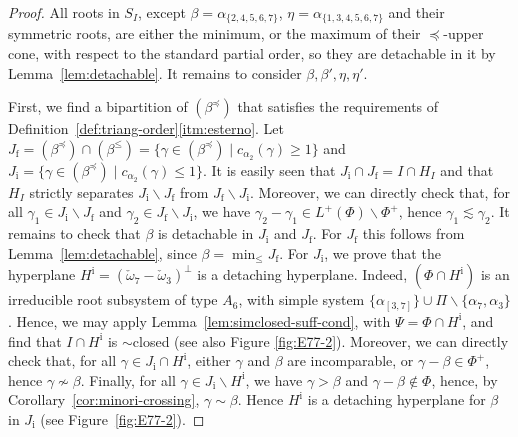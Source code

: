\documentclass[10pt]{amsart}
\theoremstyle{definition}
\theoremstyle{remark}
\newcommand\smeno{\smallsetminus}
\newcommand\al{\alpha}
\newcommand\be{\beta}
\newcommand\ga{\gamma}
\newcommand\preq{\preccurlyeq}
\renewcommand{\leq}{\leqslant}
\begin{document}
\begin{proof}
\par
All roots in $S_I$, except $\be=\al_{\{2, 4, 5, 6,7\}}$, $\eta=\al_{\{1, 3, 4, 5, 6,7\}}$ and their symmetric roots, are either the minimum, or the maximum of their $\preq$-upper cone, with respect to the standard partial order, so they are detachable in it by Lemma~\ref{lem:detachable}. 
It remains to consider $\be, \be', \eta, \eta'$.

\par
First, we find a bipartition of  $(\be^\preq)$ that satisfies the requirements of Definition~\ref{def:triang-order}\ref{itm:esterno}. 
Let $J_{\mathrm f}=(\be^\preq)\cap (\be^\leq) =\{\ga\in (\be^\preq)\mid c_{\al_2}(\ga)\geq 1\}$ and $J_{\mathrm i}=\{\ga\in (\be^\preq)\mid c_{\al_2}(\ga)\leq 1\}$. 
It is easily seen that $J_{\mathrm i}\cap J_{\mathrm f}=I\cap H_I$ and that $H_I$ strictly separates $J_{\mathrm i}\smeno J_{\mathrm f}$ from $J_{\mathrm f}\smeno J_{\mathrm i}$. 
Moreover, we can directly check that,  for all $\ga_1\in J_{\mathrm i}\smeno J_{\mathrm f}$ and $\ga_2\in J_{\mathrm f}\smeno J_{\mathrm i}$, we have $\ga_2-\ga_1 \in 
L^+(\Phi)\smeno \Phi^+$, hence $\ga_1\lesssim \ga_2$. 
It remains to check that $\be$ is detachable in  $J_{\mathrm i}$ and $J_{\mathrm f}$.
For $J_{\mathrm f}$ this follows from Lemma~\ref{lem:detachable}, since $\be=\min_\leq J_{\mathrm f}$. 
For $J_{\mathrm i}$, we prove that the hyperplane  $H^{\mathrm i}=(\check\omega_7-\check\omega_3)^\perp$ is a detaching hyperplane. 
Indeed, $(\Phi\cap H^{\mathrm i})$ is an irreducible root subsystem of type $A_6$, with simple system $\{\al_{[3,7]}\}\cup \Pi\smeno\{\al_7, \al_3\}$. 
Hence, we may apply  Lemma~\ref{lem:simclosed-suff-cond}, with $\Psi=\Phi\cap H^{\mathrm i}$, and find that $I\cap H^{\mathrm i}$ is $\sim$closed (see also Figure \ref{fig:E77-2}). 
Moreover, we can directly check that, for all $\ga\in J_{\mathrm i} \cap H^{\mathrm i}$, either $\ga$ and $\be$ are incomparable, or $\ga - \be\in \Phi^+$, hence $\ga\not\sim \be$. 
Finally, for all $\ga\in J_{\mathrm i} \smeno H^{\mathrm i}$, we have $\ga> \be$ and $\ga-\be\not\in \Phi$, hence, by Corollary~\ref{cor:minori-crossing}, $\ga\sim \be$.
Hence $H^{\mathrm i}$ is a detaching hyperplane for $\be$ in
$J_{\mathrm i}$ (see Figure~\ref{fig:E77-2}).



\end{proof}
\end{document}
